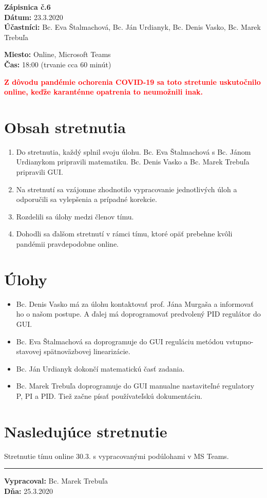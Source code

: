 
\usepackage{parskip}%
\usepackage[dvipsnames]{xcolor}

	\textbf{{\Huge Zápisnica č.6}}\\
			
	\textbf{Dátum:} 23.3.2020\\	
		
	\textbf{Účastníci:} Bc. Eva Štalmachová, Bc. Ján Urdianyk, Bc. Denis Vasko, Bc. Marek Trebuľa

	\textbf{Miesto:} Online, Microsoft Teams\\	
	
	\textbf{Čas:} 18:00 (trvanie cca 60 minút)
	
	\textbf{\textcolor{red}{Z dôvodu pandémie ochorenia COVID-19 sa toto stretunie uskutočnilo online, keďže karanténne opatrenia to neumožnili inak.}}   
    \section*{Obsah stretnutia}
    \begin{enumerate}
    	\item Do stretnutia, každý splnil svoju úlohu. Bc. Eva Štalmachová s Bc. Jánom Urdianykom pripravili matematiku. Bc. Denis Vasko a Bc. Marek Trebuľa pripravili GUI.
    	\item Na stretnutí sa vzájomne zhodnotilo vypracovanie jednotlivých úloh a odporučili sa vylepšenia a prípadné korekcie.
    	\item Rozdelili sa úlohy medzi členov tímu.
    	\item Dohodli sa ďalšom stretnutí v rámci tímu, ktoré opäť prebehne kvôli pandémii pravdepodobne online.
    \end{enumerate}    
    \section*{Úlohy}
    \begin{itemize}
    	\item Bc. Denis Vasko má za úlohu kontaktovať prof. Jána Murgaša a informovať ho o našom postupe. A ďalej má doprogramovať predvolený PID regulátor do GUI.
    	\item Bc. Eva Štalmachová sa doprogramuje do GUI reguláciu metódou vstupno-stavovej spätnoväzbovej linearizácie.
    	\item Bc. Ján Urdianyk dokončí matematickú časť zadania.
    	\item Bc. Marek Trebuľa doprogramuje do GUI manualne nastaviteľné regulatory P, PI a PID. Tiež začne písať používateľskú dokumentáciu. 
    \end{itemize}

    \section*{Nasledujúce stretnutie}
    
    Stretnutie tímu online 30.3. s vypracovanými podúlohami v MS Teams.

    
    \noindent\rule{15cm}{0.4pt}
   {\small 	\textbf{Vypracoval:} Bc. Marek Trebuľa\\
   \textbf{Dňa:} 25.3.2020 }
    

